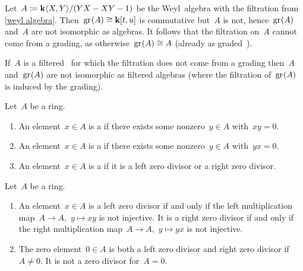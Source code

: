 \begin{example}
  Let~$A \coloneqq \mathbf{k}\langle X, Y\rangle/(YX - XY - 1)$ be the Weyl~algebra with the filtration from \cref{weyl algebra}.
  Then~$\gr(A) \cong \kf[t,u]$ is commutative but~$A$ is not, hence~$\gr(A)$ and~$A$ are not isomorphic as algebras.
  It follows that the filtration on~$A$ cannot come from a grading, as otherwise~$\gr(A) \cong A$ (already as graded~{\algebras{$\kf$}}).
\end{example}


\begin{warning}
  If~$A$ is a filtered~{\algebra{$\kf$}} for which the filtration does not come from a grading then~$A$ and~$\gr(A)$ are not isomorphic as filtered algebras (where the filtration of~$\gr(A)$ is induced by the grading).
\end{warning}


\begin{definition}
  Let~$A$ be a ring.
  \begin{enumerate}
    \item
      An element~$x \in A$ is a  if there exists some nonzero~$y \in A$ with~$xy = 0$.
    \item
      An element~$x \in A$ is a  if there exists some nonzero~$y \in A$ with~$yx = 0$.
    \item
      An element~$x \in A$ is a  if it is a left zero divisor or a right zero divisor.
  \end{enumerate}
\end{definition}


\begin{remark}
  Let~$A$ be a ring.
  \begin{enumerate}
    \item
      An element~$x \in A$ is a left zero divisor if and only if the left multiplication map~$A \to A$,~$y \mapsto xy$ is not injective.
      It is a right zero divisor if and only if the right multiplication map~$A \to A$,~$y \mapsto yx$ is not injective.
    \item
      The zero element~$0 \in A$ is both a left zero divisor and right zero divisor if~$A \neq 0$.
      It is not a zero divisor for~$A = 0$.
  \end{enumerate}
\end{remark}


